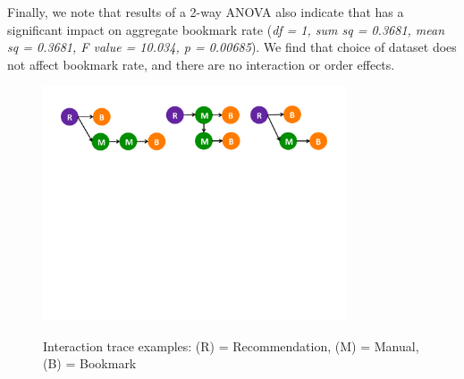 Finally, we note that results of a 2-way ANOVA also indicate that \SeeDB has a significant impact on 
aggregate bookmark rate ({\em df = 1, sum sq = 0.3681, mean sq = 0.3681, F value = 10.034, p = 0.00685}). 
We find that choice of dataset does not affect bookmark rate, and there are no interaction or order effects.

\begin{figure}
	\centering
	{\includegraphics[trim={0 0 0 0}, clip, width=9cm]{Images/traces.pdf}}
	\caption{Interaction trace examples: (R) = Recommendation, (M) = Manual, (B) = Bookmark}
	\vspace{-10pt}
	\label{fig:traces}
\end{figure}


